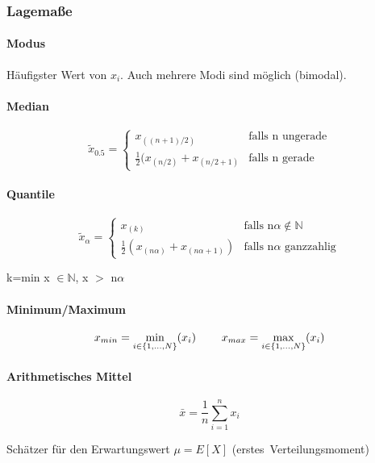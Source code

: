 \documentclass[10pt]{article}
\begin{document}
\subsubsection{Lagemaße}
\begin{multicols}{2}

\paragraph{Modus}

\noindent Häufigster Wert von $x_i$. Auch mehrere Modi sind möglich (bimodal).

\paragraph{Median}

$$\tilde{x}_{0.5}=\begin{cases} x_{((n+1)/2)} & \text{falls n ungerade} \\ \frac{1}{2}(x_{(n/2)}+x_{(n/2+1)} & \text{falls n gerade} \end{cases}$$

\paragraph{Quantile}

$$\tilde{x}_\alpha=\begin{cases} x_{(k)} & \text{falls n}\alpha \notin \mathbb{N}\\ \frac{1}{2}(x_{(n\alpha)}+ x_{(n\alpha+1)}) & \text{falls n}\alpha \text{ ganzzahlig} \end{cases}$$

\noindent k=min x $\in \mathbb{N}$,  x $>$ n$\alpha$ 

\paragraph{Minimum/Maximum}


$$x_{min}=\min_{i \in \{ 1,...,N\}} (x_i) \hspace{0.8cm}   x_{max}=\max_{i \in \{ 1,...,N\}} (x_i)$$ 



\paragraph{Arithmetisches Mittel}

 $$\bar{x}=\frac{1}{n}\sum\limits_{i=1}^n x_i$$

\noindent Schätzer für den Erwartungswert 
$\mu = E[X]$ (erstes~Verteilungsmoment)


\end{multicols}
\end{document}
